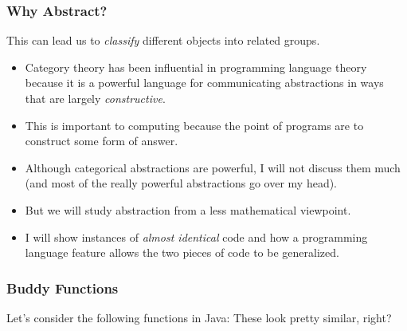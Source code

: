 \documentclass{beamer}
\begin{document}
\begin{frame}
  \frametitle{Why Abstract?}
  This can lead us to \emph{classify} different objects into
    related groups.
  \begin{itemize}
  \item<2-> Category theory has been influential in programming language theory
    because it is a powerful language for communicating abstractions in ways
    that are largely \emph{constructive}.
  \item<3-> This is important to computing because the point of programs
    are to construct some form of answer.
  \item<4-> Although categorical abstractions are powerful, I will not discuss them much (and most of the really powerful abstractions go over my head).
  \item<5-> But we will study abstraction from a less mathematical viewpoint.
  \item<6-> I will show instances of \emph{almost identical} code and how a programming language feature allows the two pieces of code to be generalized. 
  \end{itemize}    
\end{frame}


\begin{frame}
  \frametitle{Buddy Functions}
  Let's consider the following functions in Java:
  \buddies
  \pause
  These look pretty similar, right?
\end{frame}

\end{document}
